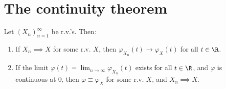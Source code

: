 \section{The continuity theorem}

\begin{thm}
\label{thm-continuity}
Let $(X_n)_{n=1}^\infty$ be r.v.'s. Then:

\begin{enumerate}[label=(\roman*)]
\item If $X_n \implies X$ for some r.v. $X$, then
$\varphi_{X_n}(t)\to \varphi_X(t)$ for all $t\in\R$.

\item If the limit
$\varphi(t) = \lim_{n\to\infty} \varphi_{X_n}(t)$
exists for all $t\in\R$, and $\varphi$ is continuous
at 0, then $\varphi\equiv \varphi_X$ for some r.v.
$X$, and $X_n \implies X$.
\end{enumerate}

\end{thm}

